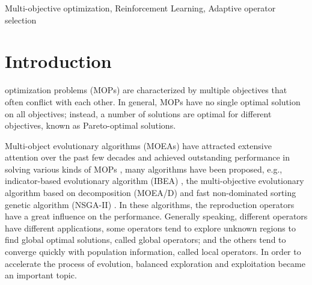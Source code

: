 \documentclass[journal]{IEEEtran}
\begin{document}
\begin{IEEEkeywords}
    Multi-objective optimization, Reinforcement Learning, Adaptive operator selection
\end{IEEEkeywords}

\section{Introduction}

 optimization problems (MOPs) are characterized by multiple objectives that often conflict with each other\cite{zhang2014efficient}. In general, MOPs have no single optimal solution on all objectives; instead, a number of solutions are optimal for different objectives, known as Pareto-optimal solutions.

Multi-object evolutionary algorithms (MOEAs) have attracted extensive attention over the past few decades and achieved outstanding performance in solving various kinds of MOPs \cite{fialho2010adaptive},
many algorithms have been proposed, e.g., indicator-based evolutionary algorithm (IBEA) \cite{IBEA}, the multi-objective evolutionary algorithm based on decomposition (MOEA/D) \cite{moead} and fast non-dominated sorting genetic algorithm (NSGA-II) \cite{nsga2}.
In these algorithms, the reproduction operators have a great influence on the performance.
Generally speaking, different operators have different applications, some operators tend to explore unknown regions to find global optimal solutions, called global operators; and the others tend to converge quickly with population information, called local operators.
In order to accelerate the process of evolution, balanced exploration and exploitation became an important topic.
\end{document}

